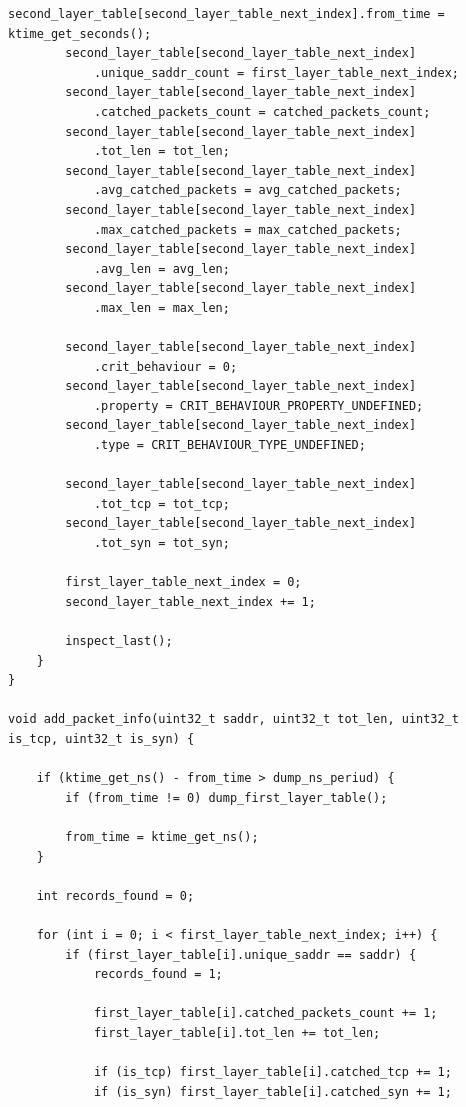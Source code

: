 \documentclass{bmstu}
\begin{document}
\begin{lstlisting}[caption = {core\_module.c}]
        second_layer_table[second_layer_table_next_index].from_time = ktime_get_seconds();
        second_layer_table[second_layer_table_next_index]
            .unique_saddr_count = first_layer_table_next_index;
        second_layer_table[second_layer_table_next_index]
            .catched_packets_count = catched_packets_count;
        second_layer_table[second_layer_table_next_index]
            .tot_len = tot_len;
        second_layer_table[second_layer_table_next_index]
            .avg_catched_packets = avg_catched_packets;
        second_layer_table[second_layer_table_next_index]
            .max_catched_packets = max_catched_packets;
        second_layer_table[second_layer_table_next_index]
            .avg_len = avg_len;
        second_layer_table[second_layer_table_next_index]
            .max_len = max_len;

        second_layer_table[second_layer_table_next_index]
            .crit_behaviour = 0;
        second_layer_table[second_layer_table_next_index]
            .property = CRIT_BEHAVIOUR_PROPERTY_UNDEFINED;
        second_layer_table[second_layer_table_next_index]
            .type = CRIT_BEHAVIOUR_TYPE_UNDEFINED;

        second_layer_table[second_layer_table_next_index]
            .tot_tcp = tot_tcp;
        second_layer_table[second_layer_table_next_index]
            .tot_syn = tot_syn;        

        first_layer_table_next_index = 0;
        second_layer_table_next_index += 1;

        inspect_last();
    }
}

void add_packet_info(uint32_t saddr, uint32_t tot_len, uint32_t is_tcp, uint32_t is_syn) {

    if (ktime_get_ns() - from_time > dump_ns_periud) {
        if (from_time != 0) dump_first_layer_table();

        from_time = ktime_get_ns();
    }

    int records_found = 0;

    for (int i = 0; i < first_layer_table_next_index; i++) {
        if (first_layer_table[i].unique_saddr == saddr) {
            records_found = 1;

            first_layer_table[i].catched_packets_count += 1;
            first_layer_table[i].tot_len += tot_len;

            if (is_tcp) first_layer_table[i].catched_tcp += 1;
            if (is_syn) first_layer_table[i].catched_syn += 1;


\end{lstlisting}
\end{document}
